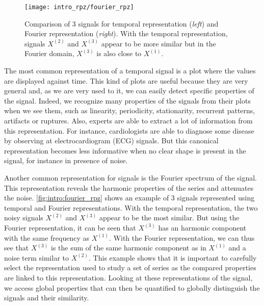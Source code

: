 \documentclass[../thesis.tex]{subfiles}
\begin{document}
\begin{figure}[tp]
	\centering
	\texttt{[image: intro\_rpz/fourier\_rpz]}
	\caption{Comparison of 3 signals for temporal representation (\emph{left}) and Fourier representation (\emph{right}). With the temporal representation, signals $X^{(2)}$ and $X^{(3)}$ appear to be more similar but in the Fourier domain, $X^{(3)}$ is also close to $X^{(1)}$.}
	\label{fig:intro:fourier_rpz}
\end{figure}



The most common representation of a temporal signal is a plot where the values are displayed against time. This kind of plots are useful because they are very general and, as we are very used to it, we can easily detect specific properties of the signal. Indeed, we recognize many properties of the signals from their plots when we see them, such as linearity, periodicity, stationarity, recurrent patterns, artifacts or ruptures. Also, experts are able to extract a lot of information from this representation. For instance, cardiologists are able to diagnose some disease by observing at electrocardiogram (ECG) signals. But this canonical representation becomes less informative when no clear shape is present in the signal, for instance in presence of noise.



Another common representation for signals is the Fourier spectrum of the signal. This representation reveals the harmonic properties of the series and attenuates the noise. \autoref{fig:intro:fourier_rpz} shows an example of 3 signals represented using temporal and Fourier representations. With the temporal representation, the two noisy signals $X^{(2)}$ and $X^{(3)}$  appear to be the most similar. But using the Fourier representation, it can be seen that $X^{(3)}$ has an harmonic component with the same frequency as $X^{(1)}$. With the Fourier representation, we can thus see that $X^{(3)}$ is the sum of the same harmonic component as in $X^{(1)}$ and a noise term similar to $X^{(2)}$. This example shows that it is important to carefully select the representation used to study a set of series as the compared properties are linked to this representation. Looking at these representations of the signal, we access global properties that can then be quantified to globally distinguish the signals and their similarity.


\end{document}

